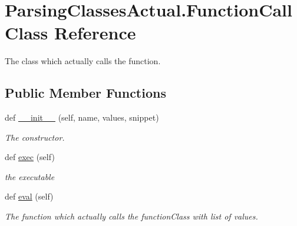 \hypertarget{class_parsing_classes_actual_1_1_function_call}{}\section{Parsing\+Classes\+Actual.\+Function\+Call Class Reference}
\label{class_parsing_classes_actual_1_1_function_call}


The class which actually calls the function.  


\subsection*{Public Member Functions}
\begin{DoxyCompactItemize}
\item 
def \hyperlink{class_parsing_classes_actual_1_1_function_call_a8129d2bc94019485d3e27f67f825a7c1}{\+\_\+\+\_\+init\+\_\+\+\_\+} (self, name, values, snippet)
\begin{DoxyCompactList}\small\item\em The constructor. \end{DoxyCompactList}\item 
def \hyperlink{class_parsing_classes_actual_1_1_function_call_a936742ba81a65d527febba924bd8aac2}{exec} (self)\hypertarget{class_parsing_classes_actual_1_1_function_call_a936742ba81a65d527febba924bd8aac2}{}\label{class_parsing_classes_actual_1_1_function_call_a936742ba81a65d527febba924bd8aac2}

\begin{DoxyCompactList}\small\item\em the executable \end{DoxyCompactList}\item 
def \hyperlink{class_parsing_classes_actual_1_1_function_call_a3f61827e167eb1869eb2edc824cbbe1b}{eval} (self)\hypertarget{class_parsing_classes_actual_1_1_function_call_a3f61827e167eb1869eb2edc824cbbe1b}{}\label{class_parsing_classes_actual_1_1_function_call_a3f61827e167eb1869eb2edc824cbbe1b}

\begin{DoxyCompactList}\small\item\em The function which actually calls the function\+Class with list of values. \end{DoxyCompactList}\end{DoxyCompactItemize}

